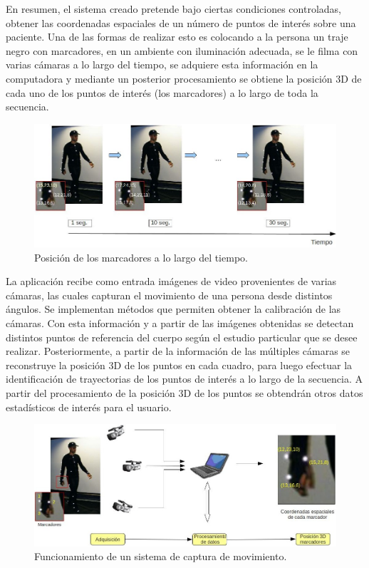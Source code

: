 En resumen, el sistema creado pretende bajo ciertas condiciones controladas, obtener las coordenadas espaciales de un número de puntos de interés sobre una paciente. Una de las formas de realizar esto es colocando a la persona un traje negro con marcadores, en un ambiente con iluminación adecuada, se le filma con varias cámaras a lo largo del tiempo, se adquiere esta información en la computadora y mediante un posterior procesamiento se obtiene la posición 3D de cada uno de los puntos de interés (los marcadores) a lo largo de toda la secuencia.

\begin{figure}[H]
\begin{center}
\includegraphics[scale=0.4]{img/Sistema_completo/diagrama_abuelas_2.jpg}
\end{center}
\caption{Posición de los marcadores a lo largo del tiempo.}
\label{abuela2}
\end{figure}

La aplicación recibe como entrada imágenes de video provenientes de varias cámaras, las cuales capturan el movimiento de una persona desde distintos ángulos. Se implementan métodos que permiten obtener la calibración de las cámaras. Con esta información y a partir de las imágenes obtenidas se detectan distintos puntos de referencia del cuerpo según el estudio particular que se desee realizar. Posteriormente, a partir de la información de las múltiples cámaras se reconstruye la posición 3D de los puntos en cada cuadro, para luego efectuar la identificación de trayectorias de los puntos de interés a lo largo de la secuencia. A partir del procesamiento de la posición 3D de los puntos se obtendrán otros datos estadísticos de interés para el usuario.

\begin{figure}[H]
\begin{center}
\includegraphics[scale=0.4]{img/Sistema_completo/diagrama_abuelas_1.jpg}
\end{center}
\caption{Funcionamiento de un sistema de captura de movimiento.}
\label{abuela1}
\end{figure}

